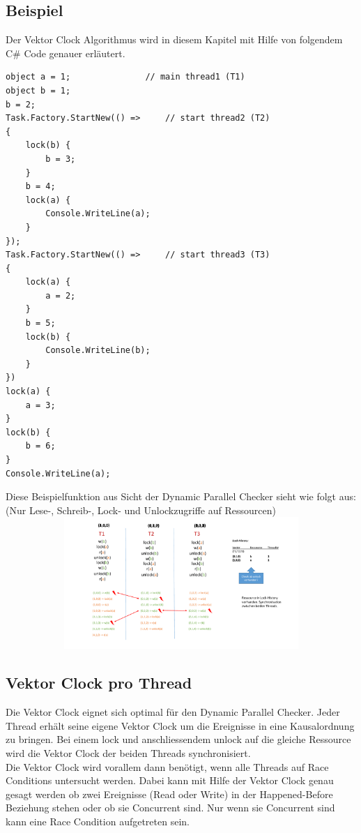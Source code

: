 \documentclass[10pt,a4paper]{article}
\begin{document}
\subsection{Beispiel}

\begin{flushleft}
Der Vektor Clock Algorithmus wird in diesem Kapitel mit Hilfe von folgendem C\# Code genauer erläutert.\\
\begin{singlespace}
\begin{lstlisting}
object a = 1;				// main thread1 (T1)
object b = 1;
b = 2;
Task.Factory.StartNew(() =>		// start thread2 (T2)
{
	lock(b) {
		b = 3;
	}
	b = 4;
	lock(a) {
		Console.WriteLine(a);
	}
});
Task.Factory.StartNew(() =>		// start thread3 (T3)
{
	lock(a) {
		a = 2;
	}
	b = 5;
	lock(b) {
		Console.WriteLine(b);
	}
})
lock(a) {
	a = 3;
}
lock(b) {
	b = 6;
}
Console.WriteLine(a);
\end{lstlisting}
\end{singlespace}
\end{flushleft}

\begin{flushleft}
Diese Beispielfunktion aus Sicht der Dynamic Parallel Checker sieht wie folgt aus: (Nur Lese-, Schreib-, Lock- und Unlockzugriffe auf Ressourcen)\\[0.5cm]
	\includegraphics[width=14cm,height=5cm,trim=20mm 90mm 110mm 20mm, clip]{pictures/VectorCheckingAlgorithm.pdf}\\
\end{flushleft}
\subsection{Vektor Clock pro Thread}
\begin{flushleft}
Die Vektor Clock eignet sich optimal für den Dynamic Parallel Checker. Jeder Thread erhält seine eigene Vektor Clock um die Ereignisse in eine Kausalordnung zu bringen. Bei einem lock und anschliessendem unlock auf die gleiche Ressource wird die Vektor Clock der beiden Threads synchronisiert.\\
Die Vektor Clock wird vorallem dann benötigt, wenn alle Threads auf Race Conditions untersucht werden. Dabei kann mit Hilfe der Vektor Clock genau gesagt werden ob zwei Ereignisse (Read oder Write) in der Happened-Before Beziehung stehen oder ob sie Concurrent sind. Nur wenn sie Concurrent sind kann eine Race Condition aufgetreten sein.
\end{flushleft}
\end{document}
